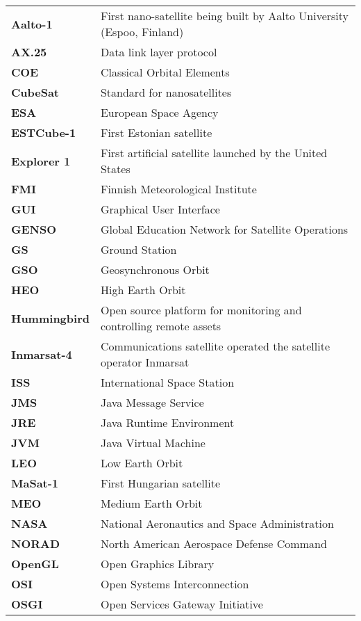 \begin{tabular}{l@{\extracolsep{1.4cm}}l}
\textbf{Aalto-1} & First nano-satellite being built by Aalto University (Espoo, Finland)\\
\textbf{AX.25}   & Data link layer protocol\\
\textbf{COE} 	 & Classical Orbital Elements\\
\textbf{CubeSat} & Standard for nanosatellites\\
\textbf{ESA} & European Space Agency\\
\textbf{ESTCube-1} & First Estonian satellite\\
\textbf{Explorer 1} & First artificial satellite launched by the United States\\
\textbf{FMI} & Finnish Meteorological Institute\\
\textbf{GUI} & Graphical User Interface\\
\textbf{GENSO} & Global Education Network for Satellite Operations\\
\textbf{GS}      & Ground Station\\
\textbf{GSO} &Geosynchronous Orbit\\
\textbf{HEO} &High Earth Orbit\\
\textbf{Hummingbird} &Open source platform for monitoring and controlling remote assets\\
\textbf{Inmarsat-4} & Communications satellite operated the satellite operator Inmarsat\\
\textbf{ISS}     & International Space Station\\
\textbf{JMS} &Java Message Service\\
\textbf{JRE} &Java Runtime Environment\\
\textbf{JVM} &Java Virtual Machine\\
\textbf{LEO}     & Low Earth Orbit\\
\textbf{MaSat-1}     & First Hungarian satellite\\
\textbf{MEO}     & Medium Earth Orbit\\
\textbf{NASA}    & National Aeronautics and Space Administration\\
\textbf{NORAD}   & North American Aerospace Defense Command\\
\textbf{OpenGL}  & Open Graphics Library\\ 	
\textbf{OSI}     & Open Systems Interconnection\\
\textbf{OSGI}    & Open Services Gateway Initiative\\

\end{tabular}
